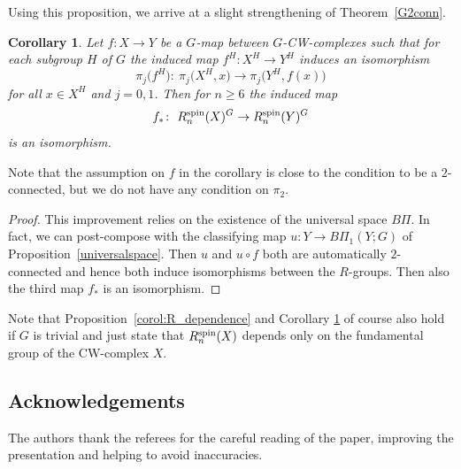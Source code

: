 \documentclass[pdftex]{sigma}
\numberwithin{equation}{section}
\newtheorem{Corollary}[Theorem]{Corollary}
\begin{document}
	Using this proposition, we arrive at a slight strengthening of Theorem~\ref{G2conn}.

	\begin{Corollary}\label{corol:R_from_pi1}
		Let $f\colon X\to Y$ be a $G$-map between $G$-CW-complexes such that for
		each subgroup $H$ of $G$ the induced map $f^H\colon X^H\to Y^H$ induces an
		isomorphism \[
\pi_j\bigl(f^H\bigr)\colon\ \pi_j\bigl(X^H,x\bigr)\to \pi_j\bigl(Y^H,f(x)\bigr)\]
 for all $x\in
		X^H$ and $j=0,1$. Then for $n\ge 6$ the induced map
		\[
f_*\colon\ R^{\rm spin}_n(X)^G\to R^{\rm spin}_n(Y)^G\]
		is an isomorphism.
	\end{Corollary}
	Note that the assumption on $f$ in the corollary is close to the condition
	to be a $2$-connected, but we do not have any condition on $\pi_2$.
	\begin{proof}
		This improvement relies on the existence of the universal space $B\Pi$. In
		fact, we can post-compose with the classifying map $u\colon Y\to B\Pi_1(Y;G)$
		of Proposition~\ref{universalspace}. Then $u$ and $u\circ f$ both are
		automatically
		$2$-connected and hence both induce isomorphisms between the
		$R$-groups. Then also the third map $f_*$ is an isomorphism.
	\end{proof}
	
\begin{Remark}
		Note that Proposition~\ref{corol:R_dependence} and Corollary
		\ref{corol:R_from_pi1} of course also hold if $G$ is trivial and just state
		that $R_n^{\rm spin}(X)$ depends only on the fundamental group of the CW-complex
		$X$.
	\end{Remark}
	
\subsection*{Acknowledgements}
The authors thank the referees for the careful reading of the paper, improving the presentation and helping to avoid inaccuracies.
\end{document}

